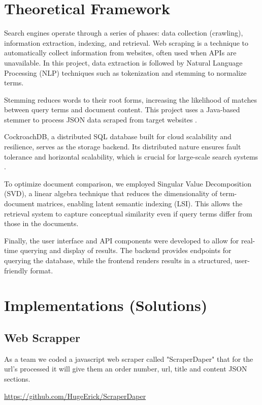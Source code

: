 \documentclass[twoside]{article}
\begin{document}
\section{Theoretical Framework}

Search engines operate through a series of phases: data collection (crawling), information extraction, indexing, and retrieval. Web scraping is a technique to automatically collect information from websites, often used when APIs are unavailable. In this project, data extraction is followed by Natural Language Processing (NLP) techniques such as tokenization and stemming to normalize terms.

Stemming reduces words to their root forms, increasing the likelihood of matches between query terms and document content. This project uses a Java-based stemmer to process JSON data scraped from target websites \cite{stemmer}.

CockroachDB, a distributed SQL database built for cloud scalability and resilience, serves as the storage backend. Its distributed nature ensures fault tolerance and horizontal scalability, which is crucial for large-scale search systems \cite{cockroach}.

To optimize document comparison, we employed Singular Value Decomposition (SVD), a linear algebra technique that reduces the dimensionality of term-document matrices, enabling latent semantic indexing (LSI). This allows the retrieval system to capture conceptual similarity even if query terms differ from those in the documents.

Finally, the user interface and API components were developed to allow for real-time querying and display of results. The backend provides endpoints for querying the database, while the frontend renders results in a structured, user-friendly format.

\section{Implementations (Solutions)}

\subsection{Web Scrapper}
As a team we coded a javascript web scraper called "ScraperDaper" that for the url's processed it will give them an order number, url, title and content JSON sections.

\url{https://github.com/HugeErick/ScraperDaper}
\end{document}
